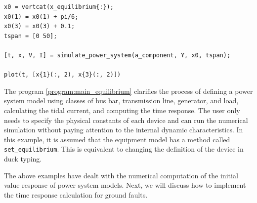 \documentclass[graybox, envcountchap]{svmult}
\begin{document}
\begin{example}
\begin{PROGRAMA}[count,title={main\_simulation\_3bus\_equilibrium.m}]
\begin{verbatim}
x0 = vertcat(x_equilibrium{:});
x0(1) = x0(1) + pi/6;
x0(3) = x0(3) + 0.1;
tspan = [0 50];

[t, x, V, I] = simulate_power_system(a_component, Y, x0, tspan);

plot(t, [x{1}(:, 2), x{3}(:, 2)])
\end{verbatim}
\end{PROGRAMA}

The program \ref{program:main_equilibrium} clarifies the process of defining a power system model using classes of bus bar, transmission line, generator, and load, calculating the tidal current, and computing the time response.
The user only needs to specify the physical constants of each device and can run the numerical simulation without paying attention to the internal dynamic characteristics.
In this example, it is assumed that the equipment model has a method called {\verb|set_equilibrium|}.
This is equivalent to changing the definition of the device in duck typing.
\end{example}

The above examples have dealt with the numerical computation of the initial value response of power system models.
Next, we will discuss how to implement the time response calculation for ground faults.
\end{document}
